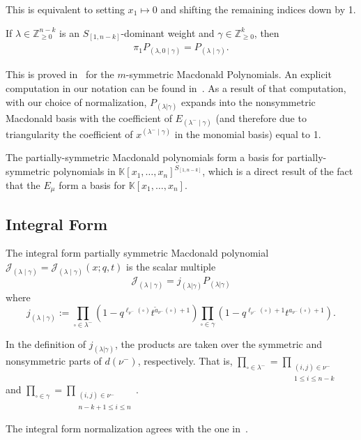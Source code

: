 \documentclass[ALCO]{cedram}
\newcommand{\Z}{\mathbb{Z}}
\newcommand{\Lq}{\mathbb{K}}
\newcommand{\Sn}{S_{[1,n-k]}}
\newcommand{\JJ}{\mathcal{J}_{(\lambda \mid \gamma)}}
\newcommand{\lambdamingamma}{(\lambda^- \mid \gamma)}
\newcommand{\jj}{j_{(\lambda \mid \gamma)}}
\newcommand{\symmetricprod}{\prod\limits_{\square \in \lambda^-}}
\newcommand{\nonsymmetricprod}{\prod\limits_{\square \in \gamma}}
\newcommand{\dg}{d}
\begin{document}
This is equivalent to setting $x_1 \mapsto 0$ and shifting the remaining indices down by 1.


\begin{prop} If $\lambda \in \Z_{\geq 0}^{n-k}$ is an $S_{[1,n-k]}$-dominant weight and $\gamma \in \Z_{\geq 0}^k$, then
\begin{align}\label{stability}\pi_1 P_{(\lambda,0\mid\gamma)} =  P_{(\lambda\mid\gamma)}.\end{align}\end{prop}

This is proved in~\cite{Lapointe} for the $m$-symmetric Macdonald Polynomials. An explicit computation in our notation can be found in~\cite{Dissertation}. As a result of that computation, with our choice of normalization, $P_{(\lambda|\gamma)}$ expands into the nonsymmetric Macdonald basis with the coefficient of $E_{\lambdamingamma}$ (and therefore due to triangularity the coefficient of $x^{\lambdamingamma}$ in the monomial basis) equal to 1.

\begin{rema}
    The partially-symmetric Macdonald polynomials form a basis for partially-symmetric polynomials in $\Lq[x_1, \dotsc, x_n]^{\Sn}$, which is a direct result of the fact that the $E_\mu$ form a basis for $\Lq[x_1,\dotsc,x_n]$.
\end{rema}


\subsection{Integral Form}\label{integralformsection}
The integral form partially symmetric Macdonald polynomial $\JJ=\JJ(x;q,t)$ is the scalar multiple
\[
\JJ = j_{(\lambda|\gamma)}P_{(\lambda|\gamma)}
\]
where
\[
\jj := \symmetricprod (1-q^{\ell_{\nu^-}(\square)}t^{\tilde{a}_{\nu^-}(\square) + 1}) \nonsymmetricprod(1-q^{\ell_{\nu^-}(\square) + 1}t^{a_{\nu^-}(\square) + 1}).
\]


In the definition of $j_{(\lambda|\gamma)}$, the products are taken over the symmetric and nonsymmetric parts of $\dg(\nu^-)$, respectively. That is, $\displaystyle{\symmetricprod}=\displaystyle{\prod_{\substack{(i,j) \in \nu^-\\ 1\leq i \leq n-k}}}$ and $\displaystyle{\nonsymmetricprod}=\displaystyle{\prod_{\substack{(i,j) \in \nu^-\\ n-k+1 \leq i \leq n}}}$.

\begin{rema}
    The integral form normalization agrees with the one in~\cite{Lapointe}.
\end{rema}
\end{document}
